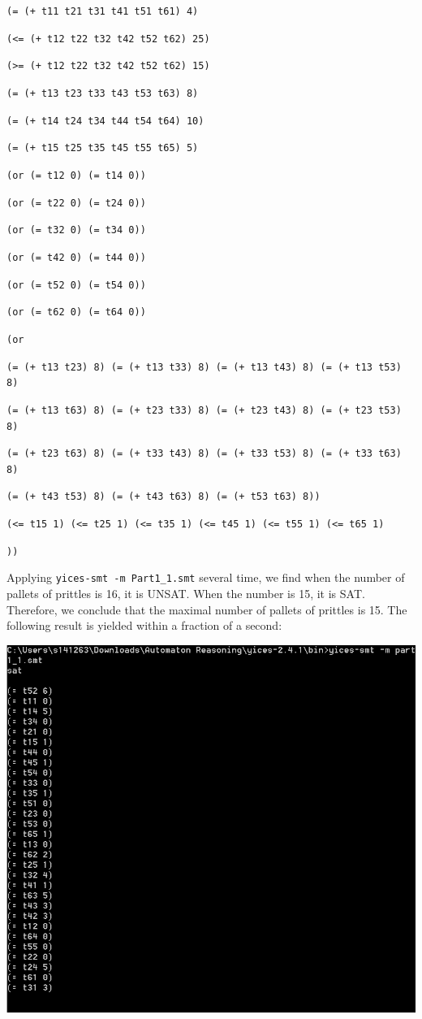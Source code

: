 \documentclass[11pt]{article}
\begin{document}
{{\tt (= (+ t11 t21 t31 t41 t51 t61) 4)}

{\tt (<= (+ t12 t22 t32 t42 t52 t62) 25)}

{\tt (>= (+ t12 t22 t32 t42 t52 t62) 15)}

{\tt (= (+ t13 t23 t33 t43 t53 t63) 8)}

{\tt (= (+ t14 t24 t34 t44 t54 t64) 10)}

{\tt (= (+ t15 t25 t35 t45 t55 t65) 5)}

{\tt (or (= t12 0) (= t14 0)) }

{\tt (or (= t22 0) (= t24 0)) }

{\tt (or (= t32 0) (= t34 0)) }

{\tt (or (= t42 0) (= t44 0)) }

{\tt (or (= t52 0) (= t54 0)) }

{\tt (or (= t62 0) (= t64 0)) }

{\tt (or}

{\tt (= (+ t13 t23) 8) (= (+ t13 t33) 8) (= (+ t13 t43) 8) (= (+ t13 t53) 8) }

{\tt (= (+ t13 t63) 8) (= (+ t23 t33) 8) (= (+ t23 t43) 8) (= (+ t23 t53) 8) }

{\tt (= (+ t23 t63) 8) (= (+ t33 t43) 8) (= (+ t33 t53) 8) (= (+ t33 t63) 8) }

{\tt (= (+ t43 t53) 8) (= (+ t43 t63) 8) (= (+ t53 t63) 8)) }

{\tt (<= t15 1) (<= t25 1) (<= t35 1) (<= t45 1) (<= t55 1) (<= t65 1)}

{\tt )) }
}

Applying {\tt yices-smt -m Part1\_1.smt} several time, we find when the number of pallets of prittles is 16, it is UNSAT. When the number is 15, it is SAT. Therefore, we conclude that the maximal number of pallets of prittles is 15.
The following result is yielded within a fraction of a second:

\begin{center}
\includegraphics[width=1.0\textwidth]{Part1_1.png}
\end{center}
\end{document}
